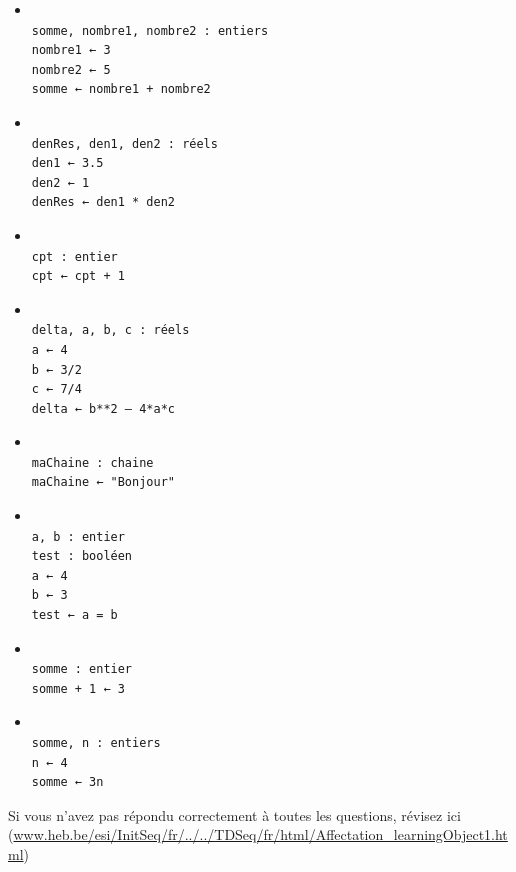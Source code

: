 \documentclass[11pt,a4paper]{article}
\begin{document}
            \begin{itemize} 
        
            \item[ \ding{"6F} ] \begin{verbatim}

somme, nombre1, nombre2 : entiers 
nombre1 ← 3 
nombre2 ← 5 
somme ← nombre1 + nombre2\end{verbatim}
        
            \item[ \ding{"6F} ] \begin{verbatim}

denRes, den1, den2 : réels 
den1 ← 3.5 
den2 ← 1 
denRes ← den1 * den2\end{verbatim}
        
            \item[ \ding{"6F} ] \begin{verbatim}
						
cpt : entier 
cpt ← cpt + 1\end{verbatim}
        
            \item[ \ding{"6F} ] \begin{verbatim}
						
delta, a, b, c : réels 
a ← 4 
b ← 3/2 
c ← 7/4 
delta ← b**2 – 4*a*c\end{verbatim}
        
            \item[ \ding{"6F} ] \begin{verbatim}
						
maChaine : chaine 
maChaine ← "Bonjour"\end{verbatim}
        
            \item[ \ding{"6F} ] \begin{verbatim}
						
a, b : entier 
test : booléen 
a ← 4 
b ← 3 
test ← a = b\end{verbatim}
        
            \item[ \ding{"6F} ] \begin{verbatim}
						
somme : entier 
somme + 1 ← 3\end{verbatim}
        
            \item[ \ding{"6F} ] \begin{verbatim}
						
somme, n : entiers 
n ← 4 
somme ← 3n\end{verbatim}
        
            \end{itemize} 
        Si vous n'avez pas r\'epondu correctement \`a toutes les questions, 
        r\'evisez ici (\url{www.heb.be/esi/InitSeq/fr/../../TDSeq/fr/html/Affectation\_learningObject1.html})
            \par
\end{document}
